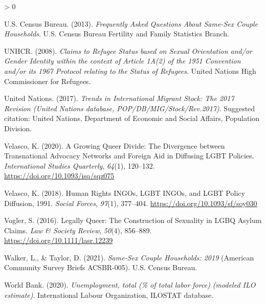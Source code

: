 \documentclass[
  11pt,
]{article}
\newlength{\cslhangindent}
\newenvironment{CSLReferences}[2] %
 {%
  \setlength{\parindent}{0pt}
  \ifodd #1 \everypar{\setlength{\hangindent}{\cslhangindent}}\ignorespaces\fi
  \ifnum #2 > 0
  \setlength{\parskip}{#2\baselineskip}
  \fi
 }%
 {}
\begin{document}
\begin{CSLReferences}{1}{0}
\leavevmode\hypertarget{ref-u.s.censusbureau_2013}{}%
U.S. Census Bureau. (2013). \emph{Frequently {Asked Questions About Same}-{Sex Couple Households}}. {U.S. Census Bureau Fertility and Family Statistics Branch}.

\leavevmode\hypertarget{ref-unhcr_2008}{}%
UNHCR. (2008). \emph{Claims to {Refugee Status} based on {Sexual Orientation} and/or {Gender Identity} within the context of {Article 1A}(2) of the 1951 {Convention} and/or its 1967 {Protocol} relating to the {Status} of {Refugees}}. {United Nations High Commissioner for Refugees}.

\leavevmode\hypertarget{ref-unitednations_2017}{}%
United Nations. (2017). \emph{Trends in {International Migrant Stock}: {The} 2017 {Revision} ({United Nations} database, {POP}/{DB}/{MIG}/{Stock}/{Rev}.2017)}. {Suggested citation: United Nations, Department of Economic and Social Affairs, Population Division}.

\leavevmode\hypertarget{ref-velasco_2020}{}%
Velasco, K. (2020). A {Growing Queer Divide}: {The Divergence} between {Transnational Advocacy Networks} and {Foreign Aid} in {Diffusing LGBT Policies}. \emph{International Studies Quarterly}, \emph{64}(1), 120--132. \url{https://doi.org/10.1093/isq/sqz075}

\leavevmode\hypertarget{ref-velasco_2018}{}%
Velasco, K. (2018). Human {Rights INGOs}, {LGBT INGOs}, and {LGBT Policy Diffusion}, 1991{}. \emph{Social Forces}, \emph{97}(1), 377--404. \url{https://doi.org/10.1093/sf/soy030}

\leavevmode\hypertarget{ref-vogler_2016}{}%
Vogler, S. (2016). Legally {Queer}: {The Construction} of {Sexuality} in {LGBQ Asylum Claims}. \emph{Law \& Society Review}, \emph{50}(4), 856--889. \url{https://doi.org/10.1111/lasr.12239}

\leavevmode\hypertarget{ref-walker_2021}{}%
Walker, L., \& Taylor, D. (2021). \emph{Same-{Sex Couple Households}: 2019} (American Community Survey Briefs ACSBR-005). {U.S. Census Bureau}.

\leavevmode\hypertarget{ref-worldbank_2020}{}%
World Bank. (2020). \emph{Unemployment, total (\% of total labor force) (modeled {ILO} estimate)}. {International Labour Organization, ILOSTAT database.}

\end{CSLReferences}
\end{document}
